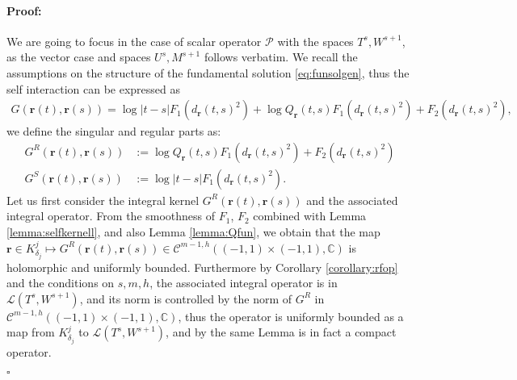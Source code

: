 \documentclass{article}
\newenvironment{proof}{\paragraph{Proof:}}{\hfill$\square$}
\newcommand{\IC}{{\mathbb C}}
\newcommand{\cmspaceh}[4]{\mathcal{C}^{#1,#2} \left( #3, #4 \right)}
\newcommand{\cP}{\mathcal{P}}
\newcommand{\br}{\bm{r}}
\newcommand{\iinterv}{(-1,1)\times(-1,1)}
\begin{document}
\begin{proof} 
We are going to focus in the case of scalar operator $\cP$ with the spaces $T^s,W^{s+1}$, as the vector case and spaces $U^s,M^{s+1}$ follows verbatim. We recall the assumptions on the structure of the fundamental solution \eqref{eq:funsolgen}, thus the self interaction can be expressed as 
\begin{align*}
G(\br(t),\br(s)) = \log|t-s| F_1(d_{\br}(t,s)^2)+ \log Q_{\br}(t,s)F_1(d_{\br}(t,s)^2) + F_2(d_{\br}(t,s)^2),
\end{align*}
we define the singular and regular parts as: 
\begin{align*}
G^R(\br(t),\br(s)) &:= \log Q_{\br}(t,s)F_1(d_{\br}(t,s)^2) + F_2(d_{\br}(t,s)^2)\\
G^S(\br(t),\br(s)) &:= \log|t-s| F_1(d_{\br}(t,s)^2).
\end{align*}
Let us first consider the integral kernel $G^R(\br(t),\br(s))$ and the associated integral operator. From the smoothness of $F_1$, $F_2$ combined with Lemma \ref{lemma:selfkernell}, and also Lemma \ref{lemma:Qfun}, we obtain that the map $\br \in K^j_{\delta_j} \mapsto G^R(\br(t),\br(s)) \in \cmspaceh{m-1}{h}{\iinterv}{\IC}$ is holomorphic and uniformly bounded. Furthermore by Corollary \ref{corollary:rfop} and the conditions on $s,m,h$, the associated integral operator is in $\mathcal{L}(T^s,W^{s+1})$, and its norm is controlled by the norm of $G^R$ in $\cmspaceh{m-1}{h}{\iinterv}{\IC}$, thus the operator is uniformly bounded as a map from $K^j_{\delta_j}$ to $\mathcal{L}(T^s,W^{s+1})$, and by the same Lemma is in fact a compact operator.


\end{proof}
\end{document}
